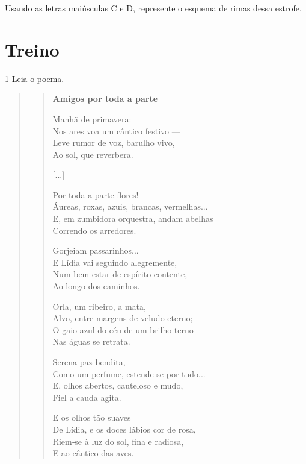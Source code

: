 Usando as letras maiúsculas C e D, represente o esquema de rimas dessa estrofe.


\section{Treino}

\num{1} Leia o poema.

\begin{quote}
\begin{verse}
\textbf{Amigos por toda a parte}

Manhã de primavera:\\
Nos ares voa um cântico festivo ---\\
Leve rumor de voz, barulho vivo,\\
Ao sol, que reverbera.

{[}...{]}

Por toda a parte flores!\\
Áureas, roxas, azuis, brancas, vermelhas...\\
E, em zumbidora orquestra, andam abelhas\\
Correndo os arredores.

Gorjeiam passarinhos...\\
E Lídia vai seguindo alegremente,\\
Num bem‑estar de espírito contente,\\
Ao longo dos caminhos.

Orla, um ribeiro, a mata,\\
Alvo, entre margens de veludo eterno;\\
O gaio azul do céu de um brilho terno\\
Nas águas se retrata.

Serena paz bendita,\\
Como um perfume, estende‑se por tudo...\\
E, olhos abertos, cauteloso e mudo,\\
Fiel a cauda agita.

E os olhos tão suaves\\
De Lídia, e os doces lábios cor de rosa,\\
Riem‑se à luz do sol, fina e radiosa,\\
E ao cântico das aves.
\end{verse}
\end{quote}


